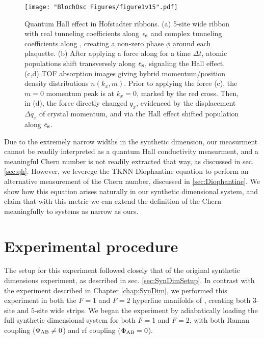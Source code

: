 \begin{figure*}
\texttt{[image: "BlochOsc Figures/figure1v15".pdf]}
\caption{Quantum Hall effect in Hofstadter ribbons. (a) 5-site wide ribbon with real tunneling coefficients along $\bf{\mathit{e}_s}$   and complex tunneling coefficients along \ex,  creating a non-zero phase  $\phi$ around each plaquette. (b) After applying a force along \ex  for a time $\Delta t$, atomic populations shift transversely along $\bf{\mathit{e}_s}$, signaling the Hall effect. (c,d)  TOF absorption images giving hybrid momentum/position density distributions $n(k_x,m)$. Prior to applying the force (c), the $m=0$ momentum peak is at $k_x=0$, marked by the red cross. Then, in (d), the force directly changed $q_x$, evidenced by the displacement $\Delta q_x$ of crystal momentum, and via the Hall effect shifted population along $\bf{\mathit{e}_s}$. }
\label{fig:laughlinPump}
\end{figure*}

Due to the extremely narrow widths in the synthetic dimension, our measurment cannot be readily interpreted as a quantum Hall conductivity measurment, and a meaningful Chern number is not readily extracted that way, as discussed in sec. \ref{sec:qh}. However, we leverege the TKNN Diophantine equation \cite{Thouless1982} to perform an alternative measurement of the Chern number, discussed in \ref{sec:Diophantine}. We show how this equation arises naturally in our synthetic dimensional system, and claim that with this metric we can extend the definition of the Chern meaningfully to systems as narrow as ours.  

\section{Experimental procedure}

The setup for this experiment followed closely that of the original synthetic dimensions experiment, as described in sec. \ref{sec:SynDimSetup}. In contrast with the experiment described in Chapter \ref{chap:SynDim}, we performed this experiment in both the $F=1$ and $F=2$ hyperfine manifolds of \Rb{}, creating both $3$-site and $5$-site wide strips. We began the experiment by adiabatically loading the full synthetic dimensional system for both $F=1$ and $F=2$, with both Raman coupling ($\Phi_{\rm AB}\neq0$) and rf coupling ($\Phi_{\rm AB}=0$). 

